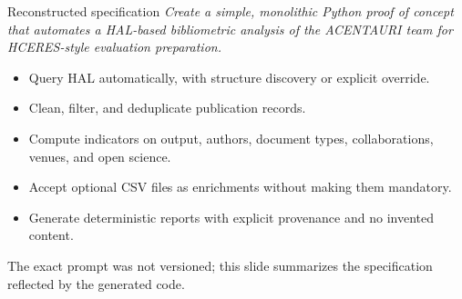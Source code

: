 \begin{frame}[t]

  \small

  \begin{block}{Reconstructed specification}
    \emph{Create a simple, monolithic Python proof of concept that automates a HAL-based bibliometric analysis of the ACENTAURI team for HCERES-style evaluation preparation.}
  \end{block}

  \begin{itemize}
    \item Query HAL automatically, with structure discovery or explicit override.
    \item Clean, filter, and deduplicate publication records.
    \item Compute indicators on output, authors, document types, collaborations, venues, and open science.
    \item Accept optional CSV files as enrichments without making them mandatory.
    \item Generate deterministic reports with explicit provenance and no invented content.
  \end{itemize}

  \vspace{0.4em}

  \scriptsize
  The exact prompt was not versioned; this slide summarizes the specification reflected by the generated code.
\end{frame}

